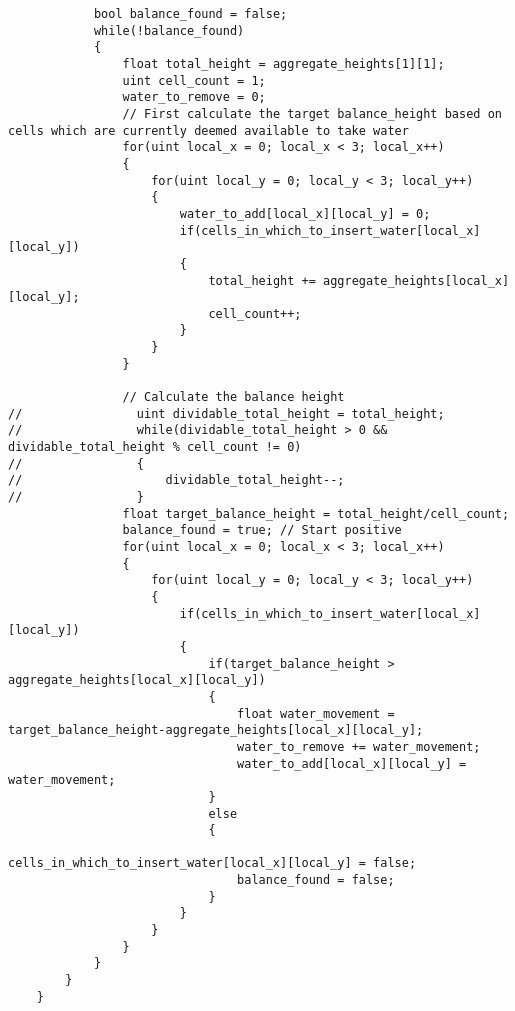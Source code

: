 \begin{verbatim}
            bool balance_found = false;
            while(!balance_found)
            {
                float total_height = aggregate_heights[1][1];
                uint cell_count = 1;
                water_to_remove = 0;
                // First calculate the target balance_height based on cells which are currently deemed available to take water
                for(uint local_x = 0; local_x < 3; local_x++)
                {
                    for(uint local_y = 0; local_y < 3; local_y++)
                    {
                        water_to_add[local_x][local_y] = 0;
                        if(cells_in_which_to_insert_water[local_x][local_y])
                        {
                            total_height += aggregate_heights[local_x][local_y];
                            cell_count++;
                        }
                    }
                }

                // Calculate the balance height
//                uint dividable_total_height = total_height;
//                while(dividable_total_height > 0 && dividable_total_height % cell_count != 0)
//                {
//                    dividable_total_height--;
//                }
                float target_balance_height = total_height/cell_count;
                balance_found = true; // Start positive
                for(uint local_x = 0; local_x < 3; local_x++)
                {
                    for(uint local_y = 0; local_y < 3; local_y++)
                    {
                        if(cells_in_which_to_insert_water[local_x][local_y])
                        {
                            if(target_balance_height > aggregate_heights[local_x][local_y])
                            {
                                float water_movement = target_balance_height-aggregate_heights[local_x][local_y];
                                water_to_remove += water_movement;
                                water_to_add[local_x][local_y] = water_movement;
                            }
                            else
                            {
                                cells_in_which_to_insert_water[local_x][local_y] = false;
                                balance_found = false;
                            }
                        }
                    }
                }
            }
        }
    }


\end{verbatim}
